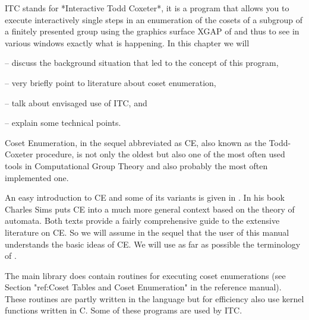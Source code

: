 \def\ITC{{\sf ITC}}
\def\XGAP{{\sf XGAP}}



{\ITC} stands for *Interactive Todd Coxeter*, it is a program that
allows you to execute interactively single steps in an enumeration of
the cosets of a subgroup of a finitely presented group using the
graphics surface {\XGAP} of {\GAP} and thus to see in various windows
exactly what is happening. In this chapter we will

\beginlist

\item{--}
  discuss the background situation that led to the concept of this
  program,

\item{--}
  very briefly point to literature about coset enumeration,

\item{--}
  talk about envisaged use of {\ITC}, and

\item{--}
  explain some technical points.

\endlist



Coset Enumeration, in the sequel abbreviated as CE, also known as the
Todd-Coxeter procedure, is not only the oldest but also one of the most
often used tools in Computational Group Theory and also probably the
most often implemented one.

An easy introduction to CE and some of its variants is given in
\cite{Neu82}. In his book \cite{Sims94} Charles Sims puts CE into a
much more general context based on the theory of automata. Both texts
provide a fairly comprehensive guide to the extensive literature on
CE. So we will assume in the sequel that the user of this manual
understands the basic ideas of CE. We will use as far as possible the
terminology of \cite{Neu82}.

The main {\GAP} library does contain routines for executing coset
enumerations (see Section "ref:Coset Tables and Coset Enumeration" in
the {\GAP} reference manual). These routines are partly written in the
{\GAP} language but for efficiency also use {\GAP} kernel functions
written in C. Some of these programs are used by {\ITC}.

